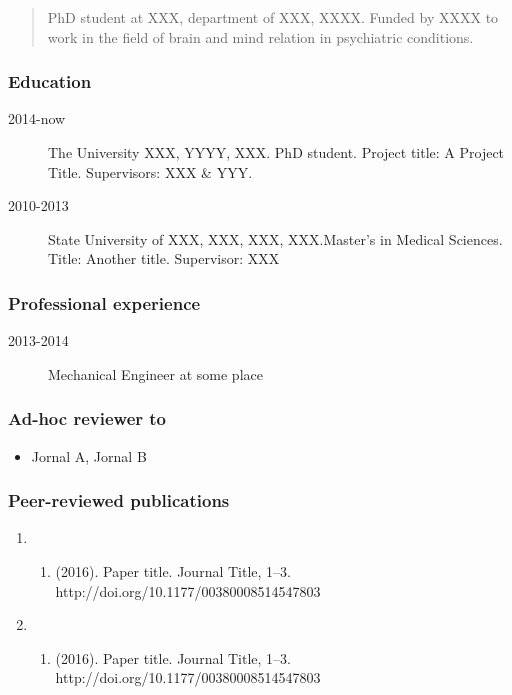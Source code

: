 \begin{quote}
PhD student at XXX, department of XXX, XXXX. Funded by XXXX to work in
the field of brain and mind relation in psychiatric conditions.
\end{quote}

\subsubsection{Education}\label{education}

\begin{description}
\item[2014-now]
The University XXX, YYYY, XXX. \newline PhD student. Project title: A
Project Title. Supervisors: XXX \& YYY.
\item[2010-2013]
State University of XXX, XXX, XXX, XXX.\newline Master's in Medical
Sciences. Title: Another title. Supervisor: XXX
\end{description}

\subsubsection{Professional experience}\label{professional-experience}

\begin{description}
\item[2013-2014]
Mechanical Engineer at some place
\end{description}

\subsubsection{Ad-hoc reviewer to}\label{ad-hoc-reviewer-to}

\begin{itemize}
\tightlist
\item
  Jornal A, Jornal B
\end{itemize}

\subsubsection{Peer-reviewed
publications}\label{peer-reviewed-publications}

\begin{enumerate}
\def\labelenumi{\arabic{enumi}.}
\item
  \begin{enumerate}
  \def\labelenumii{\Roman{enumii}.}
  \setcounter{enumii}{39}
  \tightlist
  \item
    (2016). Paper title. Journal Title, 1--3.
    http://doi.org/10.1177/00380008514547803
  \end{enumerate}
\item
  \begin{enumerate}
  \def\labelenumii{\Roman{enumii}.}
  \setcounter{enumii}{39}
  \tightlist
  \item
    (2016). Paper title. Journal Title, 1--3.
    http://doi.org/10.1177/00380008514547803
  \end{enumerate}
\end{enumerate}


